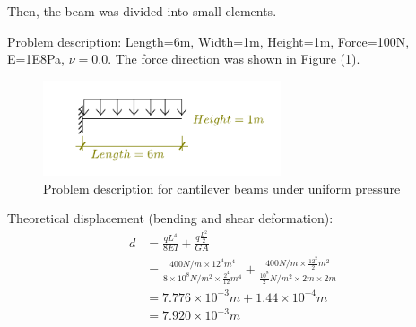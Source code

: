 \documentclass[fleqn,11pt,letter]{article}
\begin{document}

\newpage
Then, the beam was divided into small elements. 

Problem description: Length=6m, Width=1m, Height=1m, Force=100N, E=1E8Pa, $\nu=0.0$. The force direction was shown in Figure (\ref{fig Problem description for cantilever beams under uniform pressure 27}). 

\begin{figure}[H]
  \centering
  \includegraphics[width=7cm]{../Figure_files/27NodeBrick/cantilever_6_uniform_load.pdf}
  \caption{Problem description for cantilever beams under uniform pressure  }
  \label{fig Problem description for cantilever beams under uniform pressure 27}
\end{figure}


Theoretical displacement (bending and shear deformation):
\begin{equation}
  \begin{aligned}
  d &=\frac{qL^4}{8EI} + \frac{q \frac{L^2}{2}}{GA} \\ 
    &= \frac{400 N/m \times 12^4 m^4}{8\times 10^8 N/m^2 \times \frac{2^4}{12} m^4} 
       + \frac{400 N/m \times \frac{12^2}{2} m^2} {\frac{10^8}{2} N/m^2 \times 2m\times 2m} \\ 
    &=7.776\times 10^{-3} m  +1.44\times 10^{-4} m \\
    &=7.920\times 10^{-3} m
   \end{aligned}
\end{equation}
\end{document}
